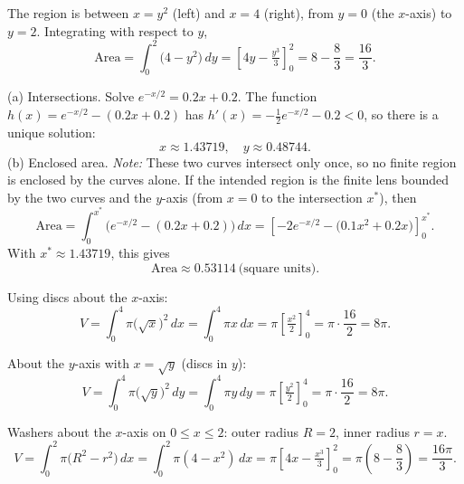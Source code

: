 \documentclass[11pt]{article}
\def\textbf#1{#1}%
\begin{document}
\begin{solution}
The region is between $x=y^{2}$ (left) and $x=4$ (right), from $y=0$ (the $x$-axis) to $y=2$.
Integrating with respect to $y$,
\[
\text{Area}=\int_{0}^{2}\big(4-y^{2}\big)\,dy=\left[4y-\tfrac{y^{3}}{3}\right]_{0}^{2}
=8-\frac{8}{3}=\boxed{\frac{16}{3}}.
\]
\end{solution}

\begin{solution}
\textbf{(a) Intersections.}
Solve $e^{-x/2}=0.2x+0.2$. The function $h(x)=e^{-x/2}-(0.2x+0.2)$ has
$h'(x)=-\tfrac12 e^{-x/2}-0.2<0$, so there is a unique solution:
\[
\boxed{x\approx 1.43719,\quad y\approx 0.48744}.
\]
\textbf{(b) Enclosed area.} 
\emph{Note:} These two curves intersect only once, so no finite region is enclosed by the curves alone. 
If the intended region is the finite lens bounded by the two curves and the $y$-axis (from $x=0$ to the intersection $x^\ast$), then
\[
\text{Area}=\int_{0}^{x^\ast}\!\Big(e^{-x/2}-(0.2x+0.2)\Big)\,dx
=\left[-2e^{-x/2}-\Big(0.1x^{2}+0.2x\Big)\right]_{0}^{x^\ast}.
\]
With $x^\ast\approx1.43719$, this gives
\[
\text{Area}\approx\boxed{0.53114}\ \text{(square units)}.
\]
\end{solution}

\begin{solution}
Using discs about the $x$-axis:
\[
V=\int_{0}^{4}\pi\big(\sqrt{x}\big)^{2}\,dx=\int_{0}^{4}\pi x\,dx
=\pi\left[\tfrac{x^{2}}{2}\right]_{0}^{4}=\pi\cdot\frac{16}{2}=\boxed{8\pi}.
\]
\end{solution}

\begin{solution}
About the $y$-axis with $x=\sqrt{y}$ (discs in $y$):
\[
V=\int_{0}^{4}\pi\big(\sqrt{y}\big)^{2}\,dy=\int_{0}^{4}\pi y\,dy
=\pi\left[\tfrac{y^{2}}{2}\right]_{0}^{4}=\pi\cdot\frac{16}{2}=\boxed{8\pi}.
\]
\end{solution}

\begin{solution}
Washers about the $x$-axis on $0\le x\le 2$:
outer radius $R=2$, inner radius $r=x$.
\[
V=\int_{0}^{2}\pi\big(R^{2}-r^{2}\big)\,dx=\int_{0}^{2}\pi(4-x^{2})\,dx
=\pi\left[4x-\tfrac{x^{3}}{3}\right]_{0}^{2}
=\pi\left(8-\frac{8}{3}\right)=\boxed{\frac{16\pi}{3}}.
\]
\end{solution}
\end{document}
